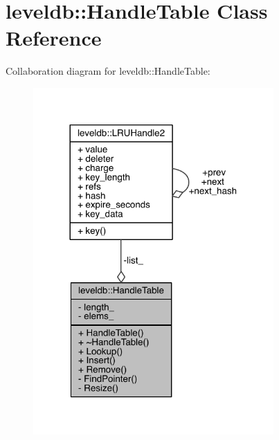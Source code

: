 \hypertarget{classleveldb_1_1_handle_table}{}\section{leveldb\+:\+:Handle\+Table Class Reference}
\label{classleveldb_1_1_handle_table}


Collaboration diagram for leveldb\+:\+:Handle\+Table\+:\nopagebreak
\begin{figure}[H]
\begin{center}
\leavevmode
\includegraphics[width=260pt]{classleveldb_1_1_handle_table__coll__graph}
\end{center}
\end{figure}
